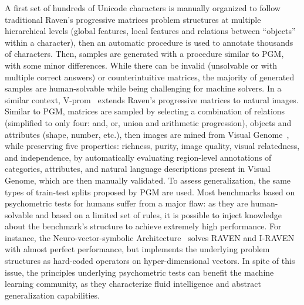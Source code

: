 A first set of hundreds of Unicode characters is manually organized to follow traditional Raven's progressive matrices problem structures at multiple hierarchical levels (global features, local features and relations between ``objects'' within a character), then an automatic procedure is used to annotate thousands of characters.
Then, samples are generated with a procedure similar to PGM, with some minor differences.
While there can be invalid (unsolvable or with multiple correct answers) or counterintuitive matrices, the majority of generated samples are human-solvable while being challenging for machine solvers.
In a similar context, V-prom~\cite{teney2020v} extends Raven's progressive matrices to natural images.
Similar to PGM, matrices are sampled by selecting a combination of relations (simplified to only four: and, or, union and arithmetic progression), objects and attributes (shape, number, etc.), then images are mined from Visual Genome~\cite{krishna2017visual}, while preserving five properties: richness, purity, image quality, visual relatedness, and independence, by automatically evaluating region-level annotations of categories, attributes, and natural language descriptions present in Visual Genome, which are then manually validated.
To assess generalization, the same types of train-test splits proposed by PGM are used.
%
%   
%
%
%   
%
%
%
Most benchmarks based on psychometric tests for humans suffer from a major flaw: as they are human-solvable and based on a limited set of rules, it is possible to inject knowledge about the benchmark's structure to achieve extremely high performance. For instance, the Neuro-vector-symbolic Architecture~\cite{hersche2023neuro} solves RAVEN and I-RAVEN with almost perfect performance, but implements the underlying problem structures as hard-coded operators on hyper-dimensional vectors.
In spite of this issue, the principles underlying psychometric tests can benefit the machine learning community, as they characterize fluid intelligence and abstract generalization capabilities.

